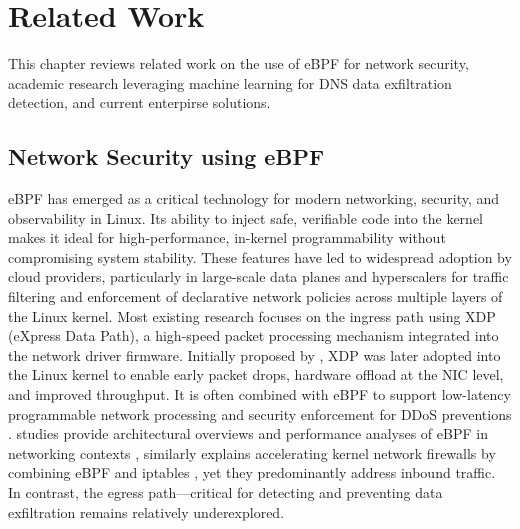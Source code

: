 \documentclass [11pt, proquest] {uwthesis}[2020/02/24]
\begin{document}
\chapter {Related Work}
This chapter reviews related work on the use of eBPF for network security, academic research leveraging machine learning for DNS data exfiltration detection, and current enterpirse solutions.

\section{Network Security using eBPF}
eBPF has emerged as a critical technology for modern networking, security, and observability in Linux. Its ability to inject safe, verifiable code into the kernel makes it ideal for high-performance, in-kernel programmability without compromising system stability. These features have led to widespread adoption by cloud providers, particularly in large-scale data planes and hyperscalers for traffic filtering and enforcement of declarative network policies across multiple layers of the Linux kernel. Most existing research focuses on the ingress path using XDP (eXpress Data Path), a high-speed packet processing mechanism integrated into the network driver firmware. Initially proposed by \citeauthor{10.1145/3281411.3281443}, XDP was later adopted into the Linux kernel to enable early packet drops, hardware offload at the NIC level, and improved throughput. It is often combined with eBPF to support low-latency programmable network processing and security enforcement for DDoS preventions \cite{10.1145/3281411.3281443, 8850758}.
\citeauthor{10.1145/3371038} studies provide architectural overviews and performance analyses of eBPF in networking contexts \cite{10.1145/3371038}, similarly \citeauthor{bertrone2018accelerating} explains accelerating kernel network firewalls by combining eBPF and iptables \cite{bertrone2018accelerating}, yet they predominantly address inbound traffic. In contrast, the egress path—critical for detecting and preventing data exfiltration remains relatively underexplored. 

\end{document}
